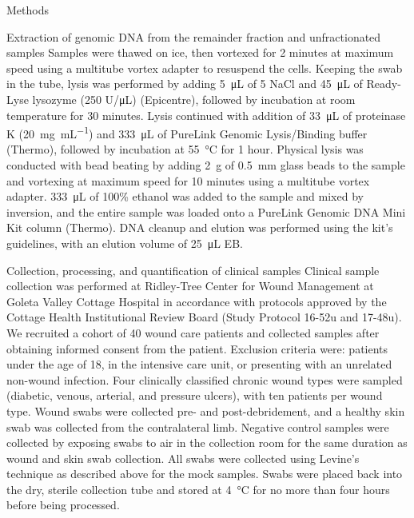 \documentclass[oneside,12pt,final]{sty/ucthesis-CA2012}
\begin{document}
\begin{mainmatter}
\begin{section}{Methods}
\begin{subsection}{Extraction of genomic DNA from the remainder fraction and unfractionated samples}
Samples were thawed on ice, then vortexed for 2 minutes at maximum speed using a multitube vortex adapter to resuspend the cells. Keeping the swab in the tube, lysis was performed by adding \SI{5}{\micro\liter} of \SI{5}{\molar} NaCl and \SI{45}{\micro\liter} of Ready-Lyse lysozyme (250 U/\si{\micro\liter}) (Epicentre), followed by incubation at room temperature for 30 minutes. Lysis continued with addition of \SI{33}{\micro\liter} of proteinase K (\SI{20}{\milli\gram\per\mL}) and \SI{333}{\micro\liter} of PureLink Genomic Lysis/Binding buffer (Thermo), followed by incubation at \SI{55}{\celsius} for 1 hour. Physical lysis was conducted with bead beating by adding \SI{2}{\gram} of \SI{0.5}{\milli\meter} glass beads to the sample and vortexing at maximum speed for 10 minutes using a multitube vortex adapter. \SI{333}{\micro\liter} of 100\% ethanol was added to the sample and mixed by inversion, and the entire sample was loaded onto a PureLink Genomic DNA Mini Kit column (Thermo). DNA cleanup and elution was performed using the kit’s guidelines, with an elution volume of \SI{25}{\micro\liter} EB.
\end{subsection}

\begin{subsection}{Collection, processing, and quantification of clinical samples}
Clinical sample collection was performed at Ridley-Tree Center for Wound Management at Goleta Valley Cottage Hospital in accordance with protocols approved by the Cottage Health Institutional Review Board (Study Protocol 16-52u and 17-48u). We recruited a cohort of 40 wound care patients and collected samples after obtaining informed consent from the patient. Exclusion criteria were: patients under the age of 18, in the intensive care unit, or presenting with an unrelated non-wound infection. Four clinically classified chronic wound types were sampled (diabetic, venous, arterial, and pressure ulcers), with ten patients per wound type. Wound swabs were collected pre- and post-debridement, and a healthy skin swab was collected from the contralateral limb. Negative control samples were collected by exposing swabs to air in the collection room for the same duration as wound and skin swab collection. All swabs were collected using Levine’s technique as described above for the mock samples. Swabs were placed back into the dry, sterile collection tube and stored at \SI{4}{\celsius} for no more than four hours before being processed.


\end{subsection}
\end{section}
\end{mainmatter}
\end{document}
